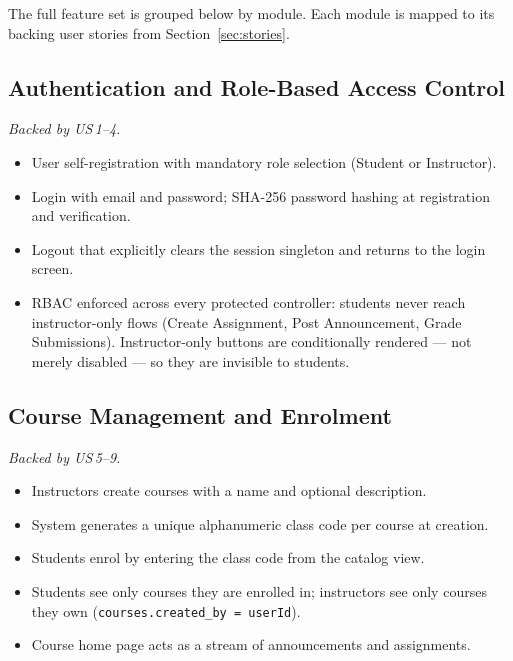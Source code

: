 \documentclass[12pt, a4paper]{article}
\begin{document}
{\sloppy
The full feature set is grouped below by module. Each module is mapped to its
backing user stories from Section~\ref{sec:stories}.

\subsection{Authentication and Role-Based Access Control}
\textit{Backed by US\,1--4.}
\begin{itemize}
  \item User self-registration with mandatory role selection (Student or Instructor).
  \item Login with email and password; SHA-256 password hashing at registration and verification.
  \item Logout that explicitly clears the session singleton and returns to the login screen.
  \item RBAC enforced across every protected controller: students never reach
        instructor-only flows (Create Assignment, Post Announcement, Grade
        Submissions). Instructor-only buttons are conditionally rendered ---
        not merely disabled --- so they are invisible to students.
\end{itemize}

\subsection{Course Management and Enrolment}
\textit{Backed by US\,5--9.}
\begin{itemize}
  \item Instructors create courses with a name and optional description.
  \item System generates a unique alphanumeric class code per course at creation.
  \item Students enrol by entering the class code from the catalog view.
  \item Students see only courses they are enrolled in; instructors see only
        courses they own (\texttt{courses.created\_by\,=\,userId}).
  \item Course home page acts as a stream of announcements and assignments.
\end{itemize}

}
\end{document}
